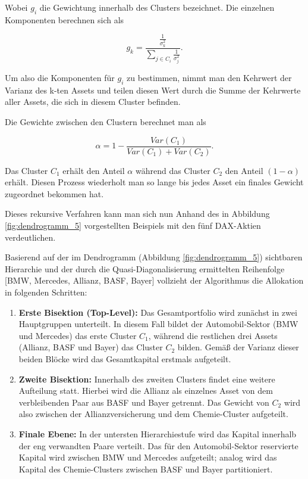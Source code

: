 \documentclass[parskip=half]{scrartcl}
\begin{document}
	Wobei $g_i$ die Gewichtung innerhalb des Clusters bezeichnet. Die einzelnen Komponenten berechnen sich als
	
	\begin{equation}
		g_k = \frac{\frac{1}{\sigma_k^2}}{\sum_{j \in C_i} \frac{1}{\sigma_j^2}} . \label{eq:ivp_weights}
	\end{equation}
	
	Um also die Komponenten für $g_i$ zu bestimmen, nimmt man den Kehrwert der Varianz des k-ten Assets und teilen diesen Wert durch die Summe der Kehrwerte aller Assets, die sich in diesem Cluster befinden.
	
	Die Gewichte zwischen den Clustern berechnet man als
	
	\begin{equation}
		\alpha = 1 - \frac{Var(C_1)}{Var(C_1) + Var(C_2)} . 
	\end{equation}
	
	Das Cluster $C_1$ erhält den Anteil $\alpha$ während das Cluster $C_2$ den Anteil $(1 - \alpha)$ erhält. Diesen Prozess wiederholt man so lange bis jedes Asset ein finales Gewicht zugeordnet bekommen hat.
	
	Dieses rekursive Verfahren kann man sich nun Anhand des in Abbildung \ref{fig:dendrogramm_5} vorgestellten Beispiels mit den fünf DAX-Aktien verdeutlichen.
	
	\clearpage
	
	
	Basierend auf der im Dendrogramm (Abbildung \ref{fig:dendrogramm_5}) sichtbaren Hierarchie und der durch die Quasi-Diagonalisierung ermittelten Reihenfolge [BMW, Mercedes, Allianz, BASF, Bayer] vollzieht der Algorithmus die Allokation in folgenden Schritten:
	
	\begin{enumerate}
		\item \textbf{Erste Bisektion (Top-Level):} Das Gesamtportfolio wird zunächst in zwei Hauptgruppen unterteilt. In diesem Fall bildet der Automobil-Sektor (BMW und Mercedes) das erste Cluster $C_1$, während die restlichen drei Assets (Allianz, BASF und Bayer) das Cluster $C_2$ bilden. Gemäß der Varianz dieser beiden Blöcke wird das Gesamtkapital erstmals aufgeteilt.
		\item \textbf{Zweite Bisektion:} Innerhalb des zweiten Clusters findet eine weitere Aufteilung statt. Hierbei wird die Allianz als einzelnes Asset von dem verbleibenden Paar aus BASF und Bayer getrennt. Das Gewicht von $C_2$ wird also zwischen der Allianzversicherung und dem Chemie-Cluster aufgeteilt.
		\item \textbf{Finale Ebene:} In der untersten Hierarchiestufe wird das Kapital innerhalb der eng verwandten Paare verteilt. Das für den Automobil-Sektor reservierte Kapital wird zwischen BMW und Mercedes aufgeteilt; analog wird das Kapital des Chemie-Clusters zwischen BASF und Bayer partitioniert.
	\end{enumerate}
	
\end{document}

